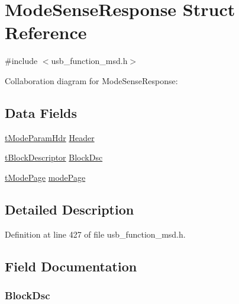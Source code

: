 \hypertarget{struct_mode_sense_response}{}\section{Mode\+Sense\+Response Struct Reference}
\label{struct_mode_sense_response}


{\ttfamily \#include $<$usb\+\_\+function\+\_\+msd.\+h$>$}



Collaboration diagram for Mode\+Sense\+Response\+:
\subsection*{Data Fields}
\begin{DoxyCompactItemize}
\item 
\hyperlink{structt_mode_param_hdr}{t\+Mode\+Param\+Hdr} \hyperlink{struct_mode_sense_response_a9479b3d436ab887d4e3c45f1dd5f7b86}{Header}
\item 
\hyperlink{structt_block_descriptor}{t\+Block\+Descriptor} \hyperlink{struct_mode_sense_response_ab98f27bf14b49022f481357d9e5923ed}{Block\+Dsc}
\item 
\hyperlink{structt_mode_page}{t\+Mode\+Page} \hyperlink{struct_mode_sense_response_a8c8f63f79a324a1fe5b468f186d3f16b}{mode\+Page}
\end{DoxyCompactItemize}


\subsection{Detailed Description}


Definition at line 427 of file usb\+\_\+function\+\_\+msd.\+h.



\subsection{Field Documentation}
\hypertarget{struct_mode_sense_response_ab98f27bf14b49022f481357d9e5923ed}{}
\subsubsection[{Block\+Dsc}]{ Block\+Dsc}\label{struct_mode_sense_response_ab98f27bf14b49022f481357d9e5923ed}


